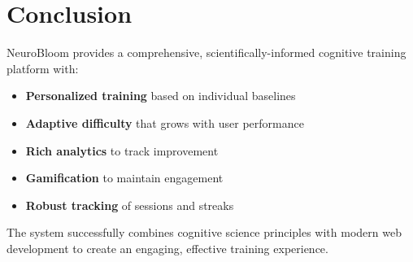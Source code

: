 \documentclass[12pt,a4paper]{article}
\begin{document}
\section{Conclusion}

NeuroBloom provides a comprehensive, scientifically-informed cognitive training platform with:

\begin{itemize}
    \item \textbf{Personalized training} based on individual baselines
    \item \textbf{Adaptive difficulty} that grows with user performance
    \item \textbf{Rich analytics} to track improvement
    \item \textbf{Gamification} to maintain engagement
    \item \textbf{Robust tracking} of sessions and streaks
\end{itemize}

The system successfully combines cognitive science principles with modern web development to create an engaging, effective training experience.
\end{document}
